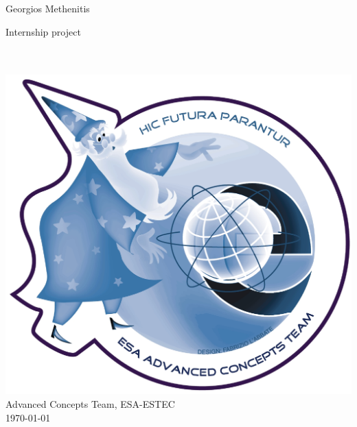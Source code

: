\documentclass[13pt]{Thesis} %
\begin{document}
\begin{titlepage}
\begin{center}
\LARGE \textcolor{NavyBlue}{\sc Georgios Methenitis}
\end{center}
\vspace{3cm}
\begin{center}
\Large \textcolor{NavyBlue}{\sc Internship project}
\textcolor{NavyBlue}{ \HRule \\[0.4cm]} %
{\Huge \bfseries \textcolor{NavyBlue}{\sc \ttitle}}\\[0.4cm] %
\textcolor{NavyBlue}{ \HRule \\[0.4cm]} %



\vspace{6cm}
\includegraphics[width=.3\textwidth]{../Figures/Misc/ACT_logo.eps}\\
\Large \textcolor{NavyBlue}{\sc Advanced Concepts Team, ESA-ESTEC}\\[2cm]
\Large \textcolor{NavyBlue}{\sc \today}


\end{center}
\end{titlepage}
\end{document}
